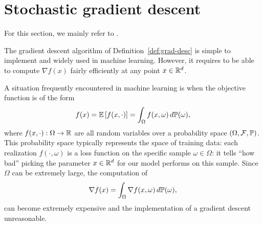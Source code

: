      \section{Stochastic gradient descent}
 
     For this section, we mainly refer to \cite{royerLecture}.
 
     The gradient descent algorithm of Definition~\ref{def:grad-desc} is simple to implement and widely used in machine learning. However, it requires to be able to compute $\nabla f(x)$ fairly efficiently at any point $x\in\mathbb{R}^d$.
 
     A situation frequently encountered in machine learning is when the objective function is of the form
     \begin{equation}
         \label{eq:loss}
         f(x) = \mathbb{E} \left[f(x,\cdot)\right] = \int_\Omega f(x,\omega)\, d\mathbb{P}(\omega),
     \end{equation}
     where $f(x,\cdot):\Omega\to \mathbb{R}$ are all random variables over a probability space $(\Omega,\mathcal{F}, \mathbb{P})$.
     This probability space typically represents the space of training data: each realization $f(\cdot,\omega)$ is a loss function on the specific sample $\omega\in \Omega$: it tells ``how bad'' picking the parameter $x\in\mathbb{R}^d$ for our model performs on this sample.
     Since $\Omega$ can be extremely large,  the computation of
     \begin{equation}
         \label{eq:full-grad}
         \nabla f(x) = \int_{\Omega} \nabla f(x,\omega) \, d\mathbb{P}(\omega),
     \end{equation}
     can become extremely expensive and the implementation of a gradient descent unreasonable.
 
 
